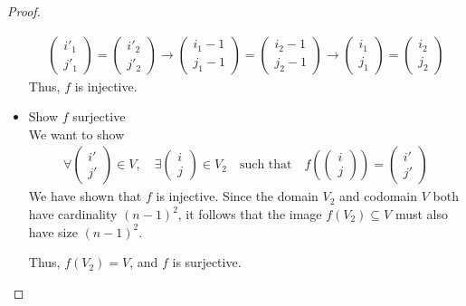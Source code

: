 \begin{proof}
\begin{itemize}
    \begin{align*}
        \begin{pmatrix} i'_1 \\ j'_1 \end{pmatrix} = \begin{pmatrix} i'_2 \\ j'_2\end{pmatrix} \longrightarrow
        \begin{pmatrix} i_1-1 \\ j_1-1 \end{pmatrix} = \begin{pmatrix} i_2-1 \\ j_2 -1\end{pmatrix} \longrightarrow
        \begin{pmatrix} i_1 \\ j_1 \end{pmatrix} = \begin{pmatrix} i_2 \\ j_2 \end{pmatrix} 
    \end{align*}
    Thus, $f$ is injective.

    \item Show $f$ surjective \\
    We want to show
    \begin{align*}
        \forall \begin{pmatrix}
            i'\\j'
        \end{pmatrix} \in V, \quad\exists \begin{pmatrix}
            i\\j
        \end{pmatrix} \in V_2 \quad\text{such that}\quad f\left(\begin{pmatrix} i \\ j \end{pmatrix}\right) = \begin{pmatrix}
            i'\\j'
        \end{pmatrix}
    \end{align*}
    We have shown that \( f \) is injective. Since the domain \( V_2 \) and codomain \( V \) both have cardinality \( (n-1)^2 \), it follows that the image \( f(V_2) \subseteq V \) must also have size \( (n-1)^2 \).

    Thus, \( f(V_2) = V \), and \( f \) is surjective.


\end{itemize}
\end{proof}
